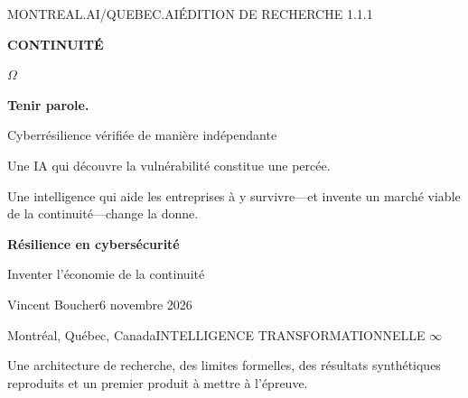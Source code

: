 \documentclass[11pt,a4paper]{article}
\begin{document}
\hypersetup{pageanchor=false}
\begin{titlepage}
\thispagestyle{empty}
\color{white}
{\sffamily\small MONTREAL.AI\enspace /\enspace QUEBEC.AI\hfill ÉDITION DE RECHERCHE 1.1.1}\par
\vspace{26mm}
{\sffamily\fontsize{39}{44}\selectfont\bfseries CONTINUITÉ}\par
\vspace{2mm}
{\fontsize{90}{94}\selectfont\color{gold}$\Omega$}\par
\vspace{7mm}
{\sffamily\fontsize{25}{30}\selectfont\bfseries Tenir parole.}\par
\vspace{5mm}
{\sffamily\Large Cyberrésilience vérifiée de manière indépendante}\par
\vspace{13mm}
\begin{minipage}{.90\textwidth}
\large
Une IA qui découvre la vulnérabilité constitue une percée.\par
\vspace{3mm}
Une intelligence qui aide les entreprises à y survivre---et invente un marché viable de la continuité---change la donne.
\end{minipage}
\vfill
{\sffamily\large\bfseries Résilience en cybersécurité}\par
{\sffamily\large Inventer l’économie de la continuité}\par
\vspace{7mm}
{\sffamily Vincent Boucher\hfill 6 novembre 2026}\par
{\sffamily\small Montréal, Québec, Canada\hfill INTELLIGENCE TRANSFORMATIONNELLE $\infty$}\par
\vspace{9mm}
{\sffamily\footnotesize Une architecture de recherche, des limites formelles, des résultats synthétiques reproduits et un premier produit à mettre à l’épreuve.}
\end{titlepage}
\setcounter{page}{1}
\hypersetup{pageanchor=true}
\end{document}
